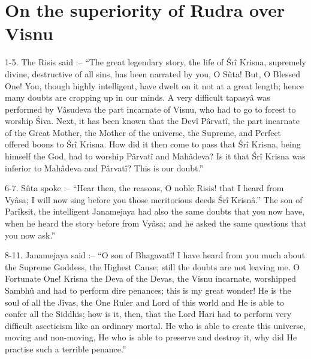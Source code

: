 ﻿\chapter{On the superiority of Rudra over Visnu}

1-5. The Risis said :-- ``The great legendary story, the life of \'Sr\^i Krisna, supremely divine, destructive of all sins, has been narrated by you, O S\^uta! But, O Blessed One! You, though highly intelligent, have dwelt on it not at a great length; hence many doubts are cropping up in our minds. A very difficult tapasy\^a was performed by V\^asudeva the part incarnate of Visnu, who had to go to forest to worship \'Siva. Next, it has been known that the Dev\^i P\^arvat\^i, the part incarnate of the Great Mother, the Mother of the universe, the Supreme, and Perfect offered boons to \'Sr\^i Krisna. How did it then come to pass that \'Sr\^i Krisna, being himself the God, had to worship P\^arvat\^i and Mah\^adeva? Is it that \'Sr\^i Krisna was inferior to Mah\^adeva and P\^arvat\^i? This is our doubt.''

6-7. S\^uta spoke :-- ``Hear then, the reasons, O noble Risis! that I heard from Vy\^asa; I will now sing before you those meritorious deeds \'Sr\^i Krisn\^a.'' The son of Par\^iksit, the intelligent Janamejaya had also the same doubts that you now have, when he heard the story before from Vy\^asa; and he asked the same questions that you now ask.''

8-11. Janamejaya said :-- ``O son of Bhagavat\^i! I have heard from you much about the Supreme Goddess, the Highest Cause; still the doubts are not leaving me. O Fortunate One! Krisna the Deva of the Devas, the Visnu incarnate, worshipped Sambh\^u and had to perform dire penances; this is my great wonder! He is the soul of all the J\^ivas, the One Ruler and Lord of this world and He is able to confer all the Siddhis; how is it, then, that the Lord Hari had to perform very difficult asceticism like an ordinary mortal. He who is able to create this universe, moving and non-moving, He who is able to preserve and destroy it, why did He practise such a terrible penance.''

